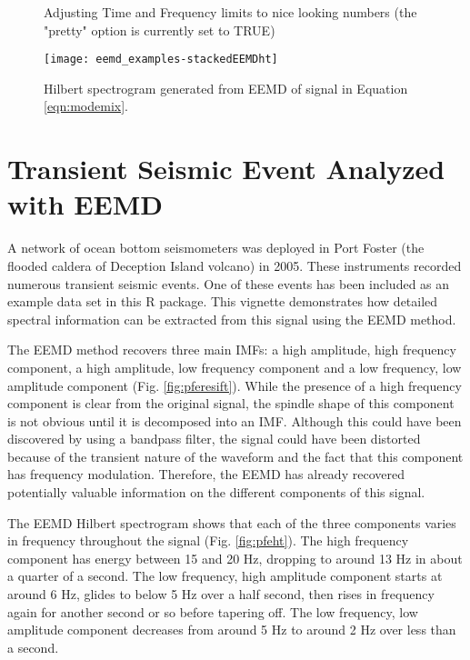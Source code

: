 \documentclass[12pt]{article}
\begin{document}
\begin{figure}[ht]
\begin{center}
\begin{Schunk}
\begin{Soutput}
Adjusting Time and Frequency limits to nice looking numbers (the "pretty" option is currently set to TRUE)
\end{Soutput}
\end{Schunk}
\texttt{[image: eemd\_examples-stackedEEMDht]}
\end{center}
\caption{Hilbert spectrogram generated from EEMD of signal in Equation \ref{eqn:modemix}.}
\label{fig:stackedEEMDht}
\end{figure}

\FloatBarrier

\section{Transient Seismic Event Analyzed with EEMD}

A network of ocean bottom seismometers was deployed in Port Foster  (the flooded caldera of Deception Island volcano) in 2005.
These instruments recorded numerous transient seismic events.
One of these events has been included as an example data set in this R package.
This vignette demonstrates how detailed spectral information can be extracted from this signal using the EEMD method.

The EEMD method recovers three main IMFs: a high amplitude, high frequency component, a high amplitude, low frequency component and a low frequency, low amplitude component (Fig. \ref{fig:pferesift}).
While the presence of a high frequency component is clear from the original signal, the spindle shape of this component is not obvious until it is decomposed into an IMF.
Although this could have been discovered by using a bandpass filter, the signal could have been distorted because of the transient nature of the waveform and the fact that this component has frequency modulation.
Therefore, the EEMD has already recovered potentially valuable information on the different components of this signal.

The EEMD Hilbert spectrogram shows that each of the three components varies in frequency throughout the signal (Fig. \ref{fig:pfeht}).
The high frequency component has energy between 15 and 20 Hz, dropping to around 13 Hz in about a quarter of a second.
The low frequency, high amplitude component starts at around 6 Hz, glides to below 5 Hz over a half second, then rises in frequency again for another second or so before tapering off.
The low frequency, low amplitude component decreases from around 5 Hz to around 2 Hz over less than a second.
\end{document}
